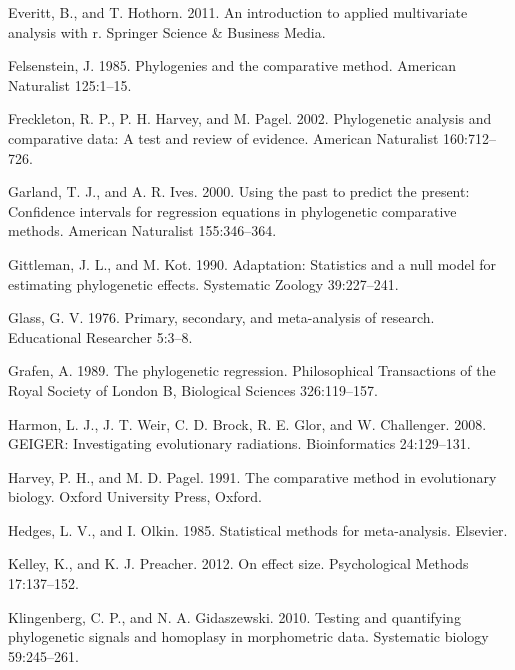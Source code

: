\documentclass[
]{article}
\begin{document}
\leavevmode\hypertarget{ref-Everitt2011}{}%
Everitt, B., and T. Hothorn. 2011. An introduction to applied
multivariate analysis with r. Springer Science \& Business Media.

\leavevmode\hypertarget{ref-Felsenstein1985}{}%
Felsenstein, J. 1985. Phylogenies and the comparative method. American
Naturalist 125:1--15.

\leavevmode\hypertarget{ref-Freckleton_et_al2002}{}%
Freckleton, R. P., P. H. Harvey, and M. Pagel. 2002. Phylogenetic
analysis and comparative data: A test and review of evidence. American
Naturalist 160:712--726.

\leavevmode\hypertarget{ref-GarlandIves2000}{}%
Garland, T. J., and A. R. Ives. 2000. Using the past to predict the
present: Confidence intervals for regression equations in phylogenetic
comparative methods. American Naturalist 155:346--364.

\leavevmode\hypertarget{ref-Gittleman1990}{}%
Gittleman, J. L., and M. Kot. 1990. Adaptation: Statistics and a null
model for estimating phylogenetic effects. Systematic Zoology
39:227--241.

\leavevmode\hypertarget{ref-Glass1976}{}%
Glass, G. V. 1976. Primary, secondary, and meta-analysis of research.
Educational Researcher 5:3--8.

\leavevmode\hypertarget{ref-Grafen1989}{}%
Grafen, A. 1989. The phylogenetic regression. Philosophical Transactions
of the Royal Society of London B, Biological Sciences 326:119--157.

\leavevmode\hypertarget{ref-Harmon2008}{}%
Harmon, L. J., J. T. Weir, C. D. Brock, R. E. Glor, and W. Challenger.
2008. GEIGER: Investigating evolutionary radiations. Bioinformatics
24:129--131.

\leavevmode\hypertarget{ref-HarveyPagel1991}{}%
Harvey, P. H., and M. D. Pagel. 1991. The comparative method in
evolutionary biology. Oxford University Press, Oxford.

\leavevmode\hypertarget{ref-HedgesOlkin1985}{}%
Hedges, L. V., and I. Olkin. 1985. Statistical methods for
meta-analysis. Elsevier.

\leavevmode\hypertarget{ref-Kelley2012}{}%
Kelley, K., and K. J. Preacher. 2012. On effect size. Psychological
Methods 17:137--152.

\leavevmode\hypertarget{ref-Klingenberg2010}{}%
Klingenberg, C. P., and N. A. Gidaszewski. 2010. Testing and quantifying
phylogenetic signals and homoplasy in morphometric data. Systematic
biology 59:245--261.
\end{document}
